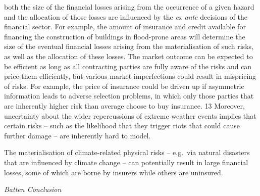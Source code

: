 \documentclass[
]{book}
\begin{document}
both the size of the financial losses arising from the occurrence of a given hazard and
the allocation of those losses are influenced by the \emph{ex ante} decisions of the financial sector.
For
example, the amount of insurance and credit available for financing the construction of
buildings in flood-prone areas will determine the size of the eventual financial losses arising
from the materialisation of such risks, as well as the allocation of these losses. The market
outcome can be expected to be efficient as long as all contracting parties are fully aware of the
risks and can price them efficiently, but various market imperfections could result in mispricing
of risks. For example, the price of insurance could be driven up if asymmetric information leads
to adverse selection problems, in which only those parties that are inherently higher risk than
average choose to buy insurance. 13 Moreover, uncertainty about the wider repercussions of
extreme weather events implies that certain risks -- such as the likelihood that they trigger riots
that could cause further damage -- are inherently hard to model.

The materialisation of climate-related physical risks -- e.g.~via natural disasters that are
influenced by climate change -- can potentially result in large financial losses, some of which are
borne by insurers while others are uninsured.

\emph{Batten Conclusion}
\end{document}

